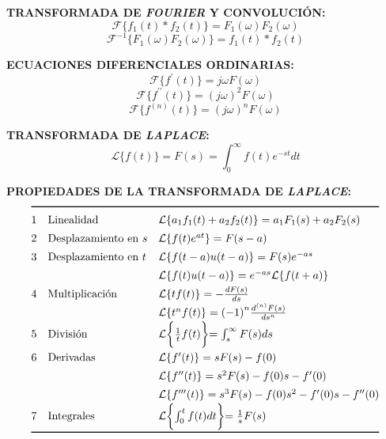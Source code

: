 \documentclass[letter,twoside,8pt]{article}
\begin{document}
\textbf{TRANSFORMADA DE \emph{FOURIER} Y CONVOLUCIÓN:}
\begin{equation*}
    \mathcal{F}\{f_1(t)*f_2(t)\}=F_1(\omega)F_2(\omega)
\end{equation*}
\begin{equation*}
    \mathcal{F}^{-1}\{F_1(\omega)F_2(\omega)\}=f_1(t)*f_2(t)
\end{equation*}

\textbf{ECUACIONES DIFERENCIALES ORDINARIAS:}
\begin{equation*}
    \mathcal{F}\{f^{\prime}(t)\}=j{\omega}F(\omega)
\end{equation*}
\begin{equation*}
    \mathcal{F}\{f^{\prime\prime}(t)\}={(j\omega)}^{2}F(\omega)
\end{equation*}
\begin{equation*}
    \mathcal{F}\{f^{(n)}(t)\}={(j\omega)}^{n}F(\omega)
\end{equation*}

\textbf{TRANSFORMADA DE \emph{LAPLACE}:}
\begin{equation*}
    \mathcal{L}\{f(t)\}=F(s)=\int_0^{\infty}f(t)e^{-st}{dt}
\end{equation*}

\textbf{PROPIEDADES DE LA TRANSFORMADA DE \emph{LAPLACE}:}
\begin{equation*}
\def\arraystretch{1.4}
\begin{array}{@{}cll@{}}
\toprule
 1 & \text{Linealidad}
   & \mathcal{L}\{a_1f_1(t)+a_2f_2(t)\}=a_1F_1(s)+a_2F_2(s)\\
 2 & \text{Desplazamiento en }s
   & \mathcal{L}\{f(t)e^{at}\}=F(s-a)\\
 3 & \text{Desplazamiento en }t
   & \mathcal{L}\{f(t-a)u(t-a)\}=F(s)e^{-as}\\
   &
   & \mathcal{L}\{f(t)u(t-a)\}=e^{-as}\mathcal{L}\{f(t+a)\}\\
 4 & \text{Multiplicación}
   & \mathcal{L}\{{t}f(t)\}=-\frac{dF(s)}{ds}\\
   &
   & \mathcal{L}\{t^{n}f(t)\}={(-1)}^n\frac{d^{(n)}F(s)}{ds^n}\\
 5 & \text{División}
   & \mathcal{L}\biggl\{\frac{1}{t}f(t)\biggl\}=\int_s^{\infty}F(s){ds}\\
 6 & \text{Derivadas}
   & \mathcal{L}\{f^{\prime}(t)\}=sF(s)-f(0)\\
   &
   & \mathcal{L}\{f^{\prime\prime}(t)\}=s^2F(s)-f(0)s-f^{\prime}(0)\\
   &
   & \mathcal{L}\{f^{\prime\prime\prime}(t)\}=s^3F(s)-f(0)s^2-f^{\prime}(0)s-f^{\prime\prime}(0)\\
 7 & \text{Integrales}
   & \mathcal{L}\biggl\{\int_0^{t}f(t){dt}\biggl\}=\frac{1}{s}F(s)\\
\bottomrule
\end{array}
\end{equation*}
\end{document}
